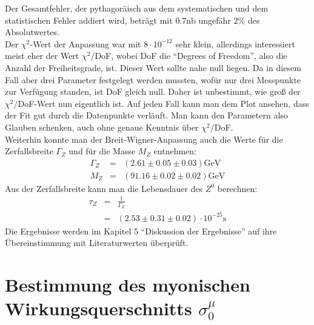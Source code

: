 Der Gesamtfehler, der pythagoräisch aus dem systematischen und dem statistischen Fehler addiert wird, beträgt mit $0.7\si{\nano\barn}$ ungefähr $2\%$ des Absolutwertes.\\
Der $\chi^2$-Wert der Anpassung war mit $8\cdot10^{-12}$ sehr klein, allerdings interessiert meist eher der Wert $\chi^2/$DoF, wobei DoF die ``Degrees of Freedom'', also die Anzahl der Freiheitsgrade, ist. Dieser Wert sollte nahe null liegen. Da in diesem Fall aber drei Parameter festgelegt werden mussten, wofür nur drei Messpunkte zur Verfügung standen, ist DoF gleich null. Daher ist unbestimmt, wie groß der $\chi^2/$DoF-Wert nun eigentlich ist. Auf jeden Fall kann man dem Plot  ansehen, dass der Fit gut durch die Datenpunkte verläuft. Man kann den Parametern also Glauben schenken, auch ohne genaue Kenntnis über $\chi^2/$DoF.\\
Weiterhin konnte man der Breit-Wigner-Anpassung auch die Werte für die Zerfallsbreite $\Gamma_Z$ und für die Masse $M_Z$ entnehmen:
\begin{eqnarray}
\Gamma_Z &=& (2.61 \pm 0.05 \pm 0.03)\si{\giga\electronvolt}\\
M_Z &=& (91.16 \pm 0.02 \pm 0.02)\si{\giga\electronvolt}
\end{eqnarray}
Aus der Zerfallsbreite kann man die Lebensdauer des $Z^0$ berechnen:
\begin{eqnarray}
\tau_Z &=& \frac{1}{\Gamma_Z}\\
&=& (2.53 \pm 0.31 \pm 0.02)\cdot 10^{-25}\si{\second}
\end{eqnarray}
Die Ergebnisse werden im Kapitel 5 ``Diskussion der Ergebnisse'' auf ihre Übereinstimmung mit Literaturwerten überprüft.

\section{Bestimmung des myonischen Wirkungsquerschnitts $\sigma_0^{\mu}$}
